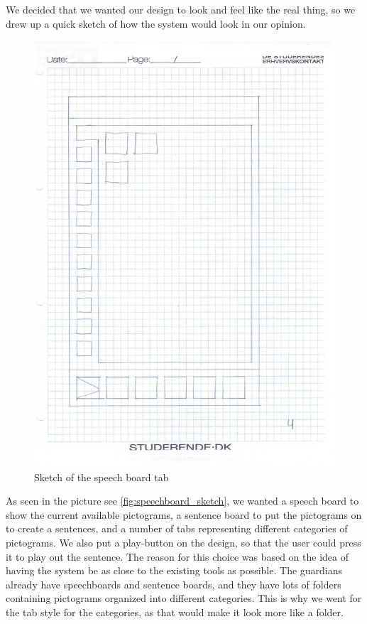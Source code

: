We decided that we wanted our design to look and feel like the real thing, so we drew up a quick sketch of how the system would look in our opinion.\newline
\begin{figure}[htbp]
	\centering
		\includegraphics[scale=0.50]{input/images/speechboard_sketch.pdf}
		\caption{Sketch of the speech board tab}
	\label{fig:speechboard_sketch}
\end{figure}
As seen in the picture see \autoref{fig:speechboard_sketch}, we wanted a speech board to show the current available pictograms, a sentence board to put the pictograms on to create a sentences, and a number of tabs representing different categories of pictograms. We also put a play-button on the design, so that the user could press it to play out the sentence.\newline
The reason for this choice was based on the idea of having the system be as close to the existing tools as possible. The guardians already have speechboards and sentence boards, and they have lots of folders containing pictograms organized into different categories. This is why we went for the tab style for the categories, as that would make it look more like a folder.\newline
